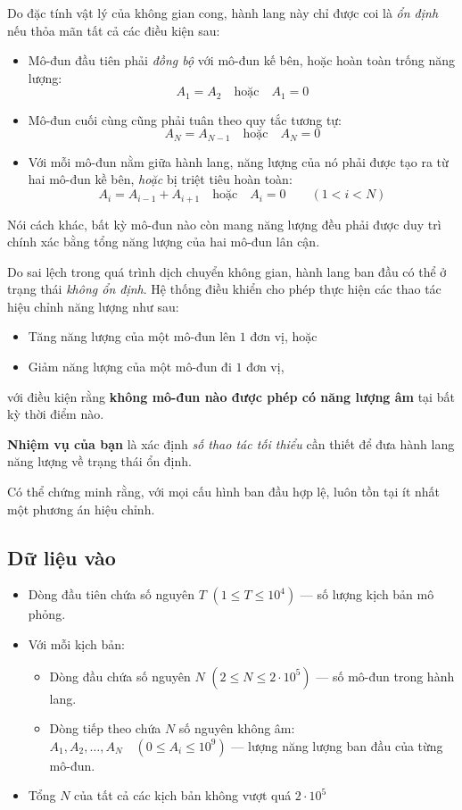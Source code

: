 Do đặc tính vật lý của không gian cong, hành lang này chỉ được coi là \emph{ổn định} nếu thỏa mãn tất cả các điều kiện sau:

\begin{itemize}
    \item Mô-đun đầu tiên phải \emph{đồng bộ} với mô-đun kế bên, hoặc hoàn toàn trống năng lượng:
    \[
    A_1 = A_2 \quad \text{hoặc} \quad A_1 = 0
    \]
    \item Mô-đun cuối cùng cũng phải tuân theo quy tắc tương tự:
    \[
    A_N = A_{N-1} \quad \text{hoặc} \quad A_N = 0
    \]
    \item Với mỗi mô-đun nằm giữa hành lang, năng lượng của nó phải được tạo ra từ hai mô-đun kề bên, \emph{hoặc} bị triệt tiêu hoàn toàn:
    \[
    A_i = A_{i-1} + A_{i+1}
    \quad \text{hoặc} \quad
    A_i = 0
    \qquad (1 < i < N)
    \]
\end{itemize}

Nói cách khác, bất kỳ mô-đun nào còn mang năng lượng đều phải được duy trì chính xác bằng tổng năng lượng của hai mô-đun lân cận.

Do sai lệch trong quá trình dịch chuyển không gian, hành lang ban đầu có thể ở trạng thái \emph{không ổn định}.
Hệ thống điều khiển cho phép thực hiện các thao tác hiệu chỉnh năng lượng như sau:

\begin{itemize}
    \item Tăng năng lượng của một mô-đun lên $1$ đơn vị, hoặc
    \item Giảm năng lượng của một mô-đun đi $1$ đơn vị,
\end{itemize}

với điều kiện rằng \textbf{không mô-đun nào được phép có năng lượng âm} tại bất kỳ thời điểm nào.

\textbf{Nhiệm vụ của bạn} là xác định \emph{số thao tác tối thiểu} cần thiết để đưa hành lang năng lượng về trạng thái ổn định.

Có thể chứng minh rằng, với mọi cấu hình ban đầu hợp lệ, luôn tồn tại ít nhất một phương án hiệu chỉnh.

\subsection*{Dữ liệu vào}

\begin{itemize}
    \item Dòng đầu tiên chứa số nguyên $T$ $(1 \le T \le 10^4)$ — số lượng kịch bản mô phỏng.
    \item Với mỗi kịch bản:
    \begin{itemize}
        \item Dòng đầu chứa số nguyên $N$ $(2 \le N \le 2 \cdot 10^5)$ — số mô-đun trong hành lang.
        \item Dòng tiếp theo chứa $N$ số nguyên không âm: $A_1, A_2, \dots, A_N \quad (0 \le A_i \le 10^9)$ — lượng năng lượng ban đầu của từng mô-đun.
    \end{itemize}
    \item Tổng $N$ của tất cả các kịch bản không vượt quá $2 \cdot 10^5$

\end{itemize}

